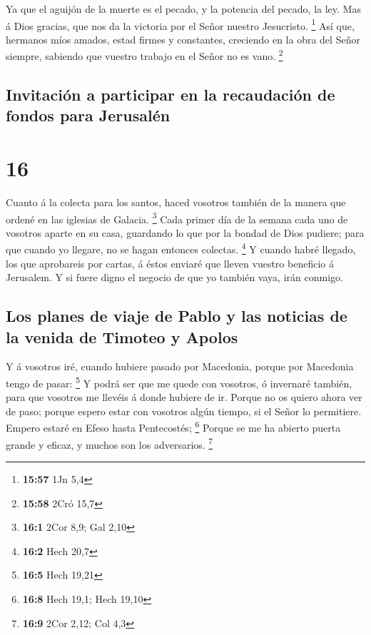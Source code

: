  Ya que el aguijón de la muerte es el pecado, y la potencia
del pecado, la ley.  Mas á Dios gracias, que nos da la
victoria por el Señor nuestro Jesucristo. \footnote{\textbf{15:57} 1Jn
  5,4}  Así que, hermanos míos amados, estad firmes y
constantes, creciendo en la obra del Señor siempre, sabiendo que vuestro
trabajo en el Señor no es vano. \footnote{\textbf{15:58} 2Cró 15,7}

\hypertarget{invitaciuxf3n-a-participar-en-la-recaudaciuxf3n-de-fondos-para-jerusaluxe9n}{%
\subsection{Invitación a participar en la recaudación de fondos para
Jerusalén}\label{invitaciuxf3n-a-participar-en-la-recaudaciuxf3n-de-fondos-para-jerusaluxe9n}}

\hypertarget{section-15}{%
\section{16}\label{section-15}}

 Cuanto á la colecta para los santos, haced vosotros también
de la manera que ordené en las iglesias de Galacia. \footnote{\textbf{16:1}
  2Cor 8,9; Gal 2,10}  Cada primer día de la semana cada uno
de vosotros aparte en su casa, guardando lo que por la bondad de Dios
pudiere; para que cuando yo llegare, no se hagan entonces colectas.
\footnote{\textbf{16:2} Hech 20,7}  Y cuando habré llegado,
los que aprobareis por cartas, á éstos enviaré que lleven vuestro
beneficio á Jerusalem.  Y si fuere digno el negocio de que
yo también vaya, irán conmigo.

\hypertarget{los-planes-de-viaje-de-pablo-y-las-noticias-de-la-venida-de-timoteo-y-apolos}{%
\subsection{Los planes de viaje de Pablo y las noticias de la venida de
Timoteo y
Apolos}\label{los-planes-de-viaje-de-pablo-y-las-noticias-de-la-venida-de-timoteo-y-apolos}}

 Y á vosotros iré, cuando hubiere pasado por Macedonia,
porque por Macedonia tengo de pasar: \footnote{\textbf{16:5} Hech 19,21}
 Y podrá ser que me quede con vosotros, ó invernaré también,
para que vosotros me llevéis á donde hubiere de ir.  Porque
no os quiero ahora ver de paso; porque espero estar con vosotros algún
tiempo, si el Señor lo permitiere.  Empero estaré en Efeso
hasta Pentecostés; \footnote{\textbf{16:8} Hech 19,1; Hech 19,10}
 Porque se me ha abierto puerta grande y eficaz, y muchos
son los adversarios. \footnote{\textbf{16:9} 2Cor 2,12; Col 4,3}

